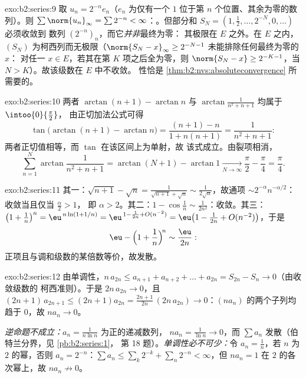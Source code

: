 \begin{solution}{exo:b2:series:9}
取 $u_n = 2^{-n} e_n$（$e_n$ 为仅有一个
$1$ 位于第 $n$ 个位置、其余为零的数列）。则 $\sum \norm{u_n}_\infty = \sum 2^{-n} <
\infty$：。但部分和 $S_N =
(1, \tfrac12, \dots, 2^{-N}, 0, \dots)$ 必须收敛到
数列 $(2^{-n})_n$，而它\emph{并非}最终为零：
其极限在 $E$ 之外。在 $E$ 之内，$(S_N)$ 为柯西列而无极限（$\norm{S_N
- x}_\infty \geq 2^{-N-1}$ 未能排除任何最终为零的 $x$：
对任一 $x \in E$，若其在第 $K$ 项之后全为零，则 $\norm{S_N - x} \geq
2^{-K-1}$，当 $N > K$）。故该级数在 $E$ 中不收敛。
性恰是 \cref{thm:b2:nvs:absoluteconvergence}
所需要的。
\end{solution}

\begin{solution}{exo:b2:series:10}
两者 $\arctan(n+1) - \arctan n$ 与
$\arctan\frac{1}{n^2+n+1}$ 均属于 $\intoo{0}{\frac\pi2}$，
由正切加法公式可得
\[
\tan\bigl(\arctan(n{+}1) - \arctan n\bigr)
= \frac{(n+1) - n}{1 + n(n+1)} = \frac{1}{n^2 + n + 1} :
\]
两者正切值相等，而 $\tan$ 在该区间上为单射，故
该式成立。由裂项相消，
\[
\sum_{n=1}^{N}\arctan\frac{1}{n^2+n+1}
= \arctan(N{+}1) - \arctan 1 \xrightarrow[N\to\infty]{}
\frac\pi2 - \frac\pi4 = \frac\pi4 .
\]

\end{solution}

\begin{solution}{exo:b2:series:11}
其一：$\sqrt{n+1} - \sqrt n = \frac{1}{\sqrt{n+1} + \sqrt n}
\sim \frac{1}{2\sqrt n}$，故通项 $\sim
2^{-\alpha}n^{-\alpha/2}$：收敛当且仅当 $\frac\alpha2 > 1$，
即 $\alpha > 2$。其二：$1 - \cos\frac1n \sim
\frac{1}{2n^2}$：收敛。其三：$\bigl(1 + \frac1n\bigr)^n =
\eu^{\,n\ln(1 + 1/n)} = \eu^{\,1 - \frac1{2n} + O(n^{-2})} =
\eu\bigl(1 - \frac{1}{2n} + O(n^{-2})\bigr)$，于是
\[
\eu - \Bigl(1 + \frac1n\Bigr)^{\!n} \sim \frac{\eu}{2n} :
\]
正项且与调和级数的某倍数等价，故发散。
\end{solution}

\begin{solution}{exo:b2:series:12}
由单调性，$n\,a_{2n} \leq a_{n+1} + a_{n+2} + \dots +
a_{2n} = S_{2n} - S_n \to 0$（由收敛级数的
柯西准则）。于是 $2n\,a_{2n} \to 0$，且 $(2n{+}1)\,
a_{2n+1} \leq (2n{+}1)a_{2n} = \frac{2n+1}{2n}\,(2n\,a_{2n}) \to
0$：$(na_n)$ 的两个子列均趋于 $0$，故 $na_n \to 0$。

\emph{逆命题不成立：}$a_n = \frac1{n\ln n}$ 为正的递减数列，
$na_n = \frac1{\ln n} \to 0$，而 $\sum a_n$
发散（伯特兰分界，见 \cref{pb:b2:series:1}，
第 18 题）。\emph{单调性必不可少：}令 $a_n = \frac1n$，若 $n$
为 $2$ 的幂，否则 $a_n = 2^{-n}$：$\sum a_n \leq
\sum_k 2^{-k} + \sum_n 2^{-n} < \infty$，但 $na_n = 1$
在 $2$ 的各次幂上，故 $na_n \not\to 0$。
\end{solution}

